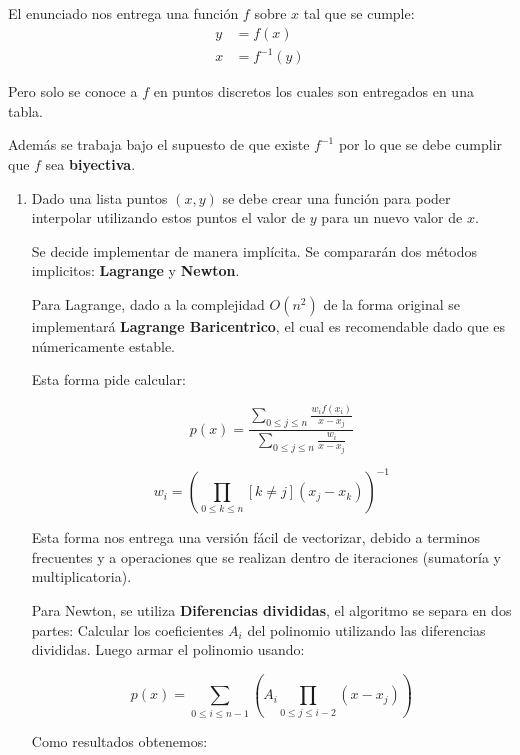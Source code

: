 \documentclass[spanish, fleqn]{article}
\title{Tarea \num\\
       \large Algoritmos y Complejidad\\[3ex]
       \emph{``Tonteando\ldots''}}
\author{Sebastián Bórquez González\\201573015-6}
\date{2 de Abril, 2018}
\begin{document}
\maketitle

	El enunciado nos entrega una función $f$ sobre $x$ tal que se cumple:
	\begin{align*}
	y &= f(x)\\
	x &= f^{-1} (y)
	\end{align*}
	
	Pero solo se conoce a $f$ en puntos discretos los cuales son entregados en una tabla.
	
	Además se trabaja bajo el supuesto de que existe $f^{-1}$ por lo que se debe cumplir que $f$ sea \textbf{biyectiva}.	
		
  \begin{enumerate}
  \item %
  Dado una lista puntos $(x,y)$ se debe crear una función para poder interpolar utilizando estos puntos el valor de $y$ para un nuevo valor de $x$. 
  
  Se decide implementar de manera implícita. Se compararán dos métodos implicitos: \textbf{Lagrange} y \textbf{Newton}.
  
  Para Lagrange, dado a la complejidad $O(n^2)$ de la forma original se implementará \textbf{Lagrange Baricentrico}, el cual es recomendable dado que es númericamente estable.
  
Esta forma pide calcular: 

	$$p(x) = \frac{\sum_{0\leq j\leq n}\frac{w_i f(x_i)}{x-x_j}}{\sum_{0\leq j\leq n}{\frac{w_i}{x-x_j}}}$$  
   
    $$w_i = \left( \prod_{0\leq k\leq n}[k \neq j] (x_j - x_k) \right)^{-1}$$
    
    Esta forma nos entrega una versión fácil de vectorizar, debido a terminos frecuentes y a operaciones que se realizan dentro de iteraciones (sumatoría y multiplicatoria).
    
    Para Newton, se utiliza \textbf{Diferencias divididas}, el algoritmo se separa en dos partes: Calcular los coeficientes $A_i$ del polinomio utilizando las diferencias divididas. Luego armar el polinomio usando:
    
    $$p(x)=\sum_{0\leq i\leq n-1}\left( A_i \prod_{0\leq j \leq i-2}(x - x_j)\right)$$
    
    Como resultados obtenemos:
    

\end{enumerate}
\end{document}
